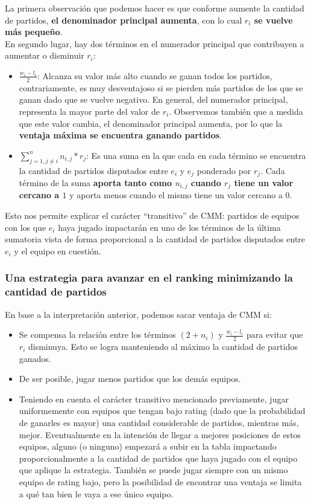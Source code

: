 La primera observación que podemos hacer es que conforme aumente la cantidad de partidos, \textbf{el denominador principal aumenta}, con lo cual \textbf{$r_i$ se vuelve más pequeño}.\\

En segundo lugar, hay dos términos en el numerador principal que contribuyen a aumentar o disminuir $r_i$:

\begin{itemize}
    \item $\frac{w_i - l_i}{2}$: Alcanza su valor más alto cuando se ganan todos los partidos, contrariamente, es muy desventajoso si se pierden más partidos de los que se ganan dado que se vuelve negativo. En general, del numerador principal, representa la mayor parte del valor de $r_i$. Observemos también que a medida que este valor cambia, el denominador principal aumenta, por lo que la \textbf{ventaja máxima se encuentra ganando partidos}.
    \item $\sum_{j=1, j \neq i}^{n}{n_{i,j} * r_j}$: Es una suma en la que cada en cada término se encuentra la cantidad de partidos disputados entre $e_i$ y $e_j$ ponderado por $r_j$. Cada término de la suma \textbf{aporta tanto como $n_{i, j}$ cuando $r_j$ tiene un valor cercano a $1$} y aporta menos cuando el mismo tiene un valor cercano a $0$.
\end{itemize}

\newpage
Esto nos permite explicar el carácter ``transitivo'' de CMM: partidos de equipos con los que $e_i$ haya jugado impactarán en uno de los términos de la última sumatoria vista de forma proporcional a la cantidad de partidos disputados entre $e_i$ y el equipo en cuestión.

\subsubsection{Una estrategia para avanzar en el ranking minimizando la cantidad de partidos}

En base a la interpretación anterior, podemos sacar ventaja de CMM si:

\begin{itemize}
    \item Se compensa la relación entre los términos $(2 + n_i)$ y $\frac{w_i - l_i}{2}$ para evitar que $r_i$ disminuya. Esto se logra manteniendo al máximo la cantidad de partidos ganados.
    \item De ser posible, jugar menos partidos que los demás equipos.
    \item Teniendo en cuenta el carácter transitivo mencionado previamente, jugar uniformemente con equipos que tengan bajo rating (dado que la probabilidad de ganarles es mayor) una cantidad considerable de partidos, mientras más, mejor. Eventualmente en la intención de llegar a mejores posiciones de estos equipos, alguno (o ninguno) empezará a subir en la tabla impactando proporcionalmente a la cantidad de partidos que haya jugado con el equipo que aplique la estrategia. También se puede jugar siempre con un mismo equipo de rating bajo, pero la posibilidad de encontrar una ventaja se limita a qué tan bien le vaya a ese único equipo.
\end{itemize}

